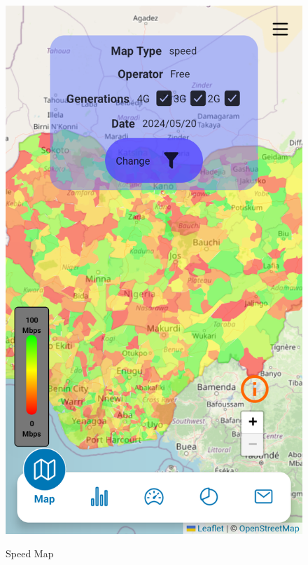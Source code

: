 \begin{figure}[H]
\begin{center}
    \begin{minipage}{0.32\textwidth}
    \includegraphics[width=\textwidth]{images/sprint3/speedMapWithInfo.png}
    \label{fig:enter-label}
    \end{minipage}\hfill
    \caption{Speed Map}
\end{center}
\end{figure}


